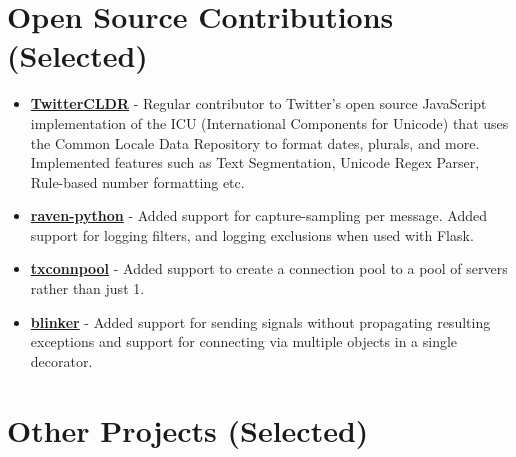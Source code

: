 \section{Open Source Contributions
(Selected)}\label{open-source-contributions-selected}

\begin{itemize}
\tightlist
\item
  \href{https://github.com/twitter/twitter-cldr-js}{\textbf{TwitterCLDR}}
  - Regular contributor to Twitter's open source JavaScript
  implementation of the ICU (International Components for Unicode) that
  uses the Common Locale Data Repository to format dates, plurals, and
  more. Implemented features such as Text Segmentation, Unicode Regex
  Parser, Rule-based number formatting etc.
\item
  \href{https://github.com/getsentry/raven-python}{\textbf{raven-python}}
  - Added support for capture-sampling per message. Added support for
  logging filters, and logging exclusions when used with Flask.
\item
  \href{https://github.com/zopim/txconnpool}{\textbf{txconnpool}} -
  Added support to create a connection pool to a pool of servers rather
  than just 1.
\item
  \href{https://github.com/zopim/blinker}{\textbf{blinker}} - Added
  support for sending signals without propagating resulting exceptions
  and support for connecting via multiple objects in a single decorator.
\end{itemize}

\section{Other Projects (Selected)}\label{other-projects-selected}

